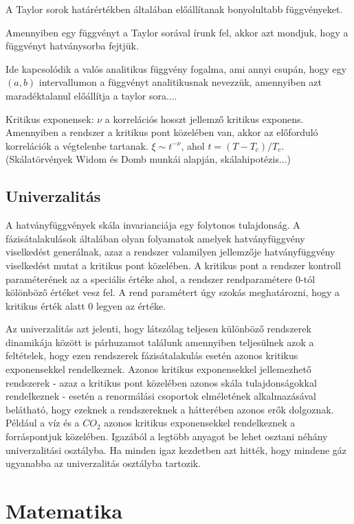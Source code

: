 A Taylor sorok határértékben általában előállítanak bonyolultabb függvényeket.

Amennyiben egy függvényt a Taylor sorával írunk fel, akkor azt mondjuk, hogy a függvényt hatványsorba fejtjük.

Ide kapcsolódik a valós analitikus függvény fogalma, ami annyi csupán, hogy egy $(a,b)$ intervallumon a függvényt analitikusnak nevezzük, amennyiben azt maradéktalanul előállítja a taylor sora....

Kritikus exponensek: $\nu$ a korrelációs hosszt jellemző kritikus exponens. Amennyiben a rendszer a kritikus pont közelében van, akkor az előforduló korrelációk a végtelenbe tartanak. $\xi \sim t^{-\nu}$, ahol $t=(T-T_c)/T_c$. (Skálatörvények Widom és Domb munkái alapján, skálahipotézis...)

\subsection{Univerzalitás}

A hatványfüggvények skála invarianciája egy folytonos tulajdonság. A fázisátalakulások általában olyan folyamatok amelyek hatványfüggvény viselkedést generálnak, azaz a rendszer valamilyen jellemzője hatványfüggvény viselkedést mutat a kritikus pont közelében. A kritikus pont a rendszer kontroll paraméterének az a speciális értéke ahol, a rendszer rendparamétere 0-tól kölönböző értéket vesz fel. A rend paramétert úgy szokás meghatározni, hogy a kritikus érték alatt 0 legyen az értéke.

Az univerzalitás azt jelenti, hogy látszólag teljesen különböző rendszerek dinamikája között is párhuzamot találunk amennyiben teljesülnek azok a feltételek, hogy ezen rendszerek fázisátalakulás esetén azonos kritikus exponensekkel rendelkeznek. Azonos kritikus exponensekkel jellemezhető rendszerek - azaz a kritikus pont közelében azonos skála tulajdonságokkal rendelkeznek - esetén a renormálási csoportok elméletének alkalmazásával belátható, hogy ezeknek a rendszereknek a hátterében azonos erők dolgoznak. Például a víz és a $CO_2$ azonos kritikus exponensekkel rendelkeznek a forráspontjuk közelében. Igazából a legtöbb anyagot be lehet osztani néhány univerzalitási osztályba. Ha minden igaz kezdetben azt hitték, hogy mindene gáz ugyanabba az univerzalitás osztályba tartozik.


\section{Matematika}

